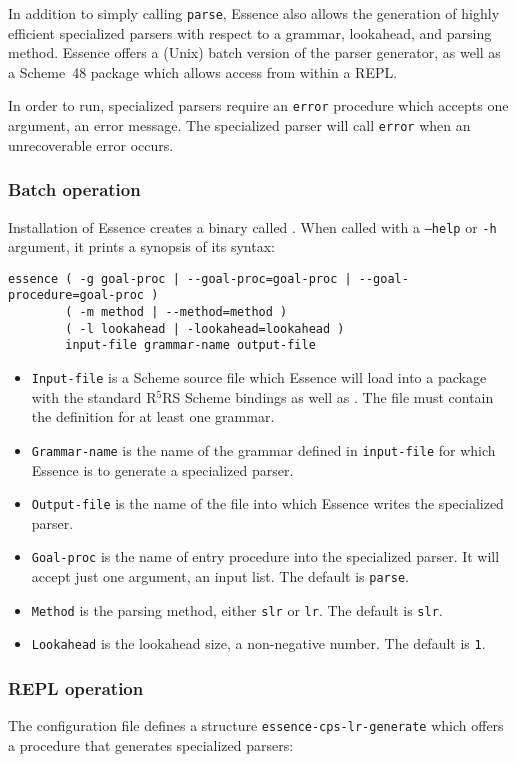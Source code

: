 \documentclass{article}
\newcommand{\codefont}[1]{\texttt{#1}}
\begin{document}
In addition to simply calling \codefont{parse}, Essence also allows
the generation of highly efficient specialized parsers with respect to
a grammar, lookahead, and parsing method.  Essence offers a (Unix)
batch version of the parser generator, as well as a Scheme~48 package
which allows access from within a REPL.

In order to run, specialized parsers require an \codefont{error}
procedure which accepts one argument, an error
message.  The specialized parser will call \codefont{error} when an
unrecoverable error occurs.

\subsubsection*{Batch operation}
Installation of Essence creates a binary called .
When called with a \codefont{--help} or \codefont{-h} argument, it
prints a synopsis of its syntax:
%
\begin{verbatim}
essence ( -g goal-proc | --goal-proc=goal-proc | --goal-procedure=goal-proc )
        ( -m method | --method=method )
        ( -l lookahead | -lookahead=lookahead )
        input-file grammar-name output-file
\end{verbatim}
%
\begin{itemize}
\item \texttt{Input-file} is a Scheme source file which Essence will
  load into a package with the standard R$^5$RS Scheme bindings as
  well as \link{\codefont{define-grammar}}{form:define-grammar}.  The
  file must contain the definition for at least one grammar.
\item \texttt{Grammar-name} is the name of the grammar defined in
  \texttt{input-file} for which Essence is to generate a specialized
  parser.
\item \texttt{Output-file} is the name of the file into which Essence
  writes the specialized parser.
\item \texttt{Goal-proc} is the name of entry procedure into the
  specialized parser.  It will accept just one argument, an input
  list.  The default is \texttt{parse}.
\item \texttt{Method} is the parsing method, either \texttt{slr} or
  \texttt{lr}.  The default is \texttt{slr}.
\item \texttt{Lookahead} is the lookahead size, a non-negative
  number.  The default is \texttt{1}.
\end{itemize}

\subsubsection*{REPL operation}
The  configuration file defines a
structure \codefont{essence-cps-lr-generate} which offers a procedure that
generates specialized parsers:
\end{document}
